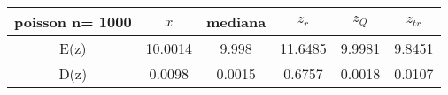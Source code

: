 \begin{tabular}{|c|c|c|c|c|c|}
\hline
poisson n= 1000& $\overline{x}$ & mediana & $z_r$ & $z_Q$ & $z_{tr}$ \\ \hline
E(z) & 10.0014 & 9.998 & 11.6485 & 9.9981 & 9.8451 \\ \hline
D(z) & 0.0098 & 0.0015 & 0.6757 & 0.0018 & 0.0107 \\ \hline
\end{tabular}